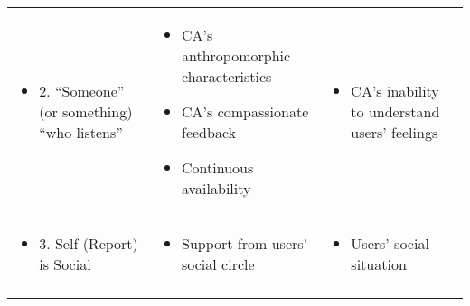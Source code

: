 \begin{table}[h]
\begin{tabular}{p{3.20cm} p{4.65cm} p{4.65cm}}
            
            \begin{itemize}[leftmargin=0em]
                \item[] 2. ``Someone'' (or something) ``who listens''
            \end{itemize}
        & 
            \begin{itemize}[leftmargin=1em]
                \item \ac{CA}'s anthropomorphic characteristics
                \item \ac{CA}'s compassionate feedback 
                \item Continuous availability 
            \end{itemize}
        &  
            \begin{itemize}[leftmargin=1em]
                \item \ac{CA}'s inability to understand users' feelings
            \end{itemize} \\
            

            
            \begin{itemize}[leftmargin=0em]
                \item[] 3. Self (Report) is Social
            \end{itemize}
        & 
            \begin{itemize}[leftmargin=1em]
                \item Support from users' social circle
            \end{itemize}
        &  
            \begin{itemize}[leftmargin=1em]
                \item Users' social situation
            \end{itemize} \\ \rowcolor[gray]{.95}  
            

\end{tabular}
\end{table}
